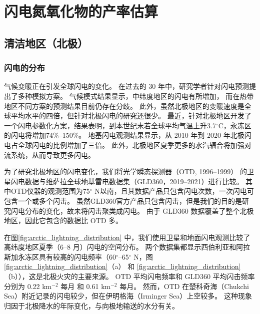 
\chapter{闪电氮氧化物的产率估算} \label{chapter:PE}

\section{清洁地区（北极）}

\subsection{闪电的分布} \label{subsect:lightning_distribution}

气候变暖正在引发全球闪电的变化\citep{Reeve.1999,Williams.2005a,Price.2009a}。
在过去的 30 年中，研究学者针对闪电预测提出了多种模拟方案\citep{Price.1992,Price.1997b,Allen.2002,Futyan.2007,Finney.2014,Romps.2014}。
气候模式结果显示，中纬度地区的闪电有所增加\citep{Michalon.1999,Romps.2014,Luhar.2021}，
而在热带地区不同方案的预测结果目前仍存在分歧\citep{Finney.2018,Romps.2019}。
此外，虽然北极地区的变暖速度是全球平均水平的四倍\citep{Rantanen.2022}，但针对北极闪电的研究还很少。
最近，\citet{Chen.2021a}针对北极地区开发了一个闪电参数化方案，结果表明，到本世纪末若全球平均气温上升3.7$^{\circ}$C，永冻区的闪电将增加74\%--150\%。
地基闪电观测结果显示，从 2010 年到 2020 年北极闪电占全球闪电的比例增加了三倍\citep{Holzworth.2021}。
此外，北极地区夏季更多的水汽辐合将加强对流系统，从而导致更多闪电\citep{Bintanja.2020}。

为了研究北极地区的闪电变化，我们将光学瞬态探测器（OTD, 1996--1999）\citep{Christian.2003} 的卫星闪电数据与维萨拉全球地基雷电数据集（GLD360，2019--2021）进行比较。
其中OTD仪器的观测范围为75$^{\circ}$ N以南，且其数据产品只包含闪电次数，一次闪电可包含一个或多个闪击。
虽然GLD360官方产品只包含闪击，但是我们的目的是研究闪电分布的变化，故未将闪击聚类成闪电。
由于 GLD360 数据覆盖了整个北极地区，因此它包含的数据比 OTD 多。

在图\ref{fig:arctic_lightning_distribution} 中，我们使用卫星和地面闪电观测比较了高纬度地区夏季（6--8 月）闪电的空间分布。
两个数据集都显示西伯利亚和阿拉斯加永冻区具有较高的闪电频率（60$^{\circ}$--65$^{\circ}$ N，图\ref{fig:arctic_lightning_distribution}（a） 和 \ref{fig:arctic_lightning_distribution} （b）），这是北极火灾的主要来源\citep{McCarty.2021}。
OTD 平均闪电频率和 GLD360 平均闪击频率分别为 0.22 km$^{-2}$ 每月 和 0.61 km$^{-2}$ 每月。
然而，OTD 在楚科奇海（Chukchi Sea）附近记录的闪电较少，但在伊明格海（Irminger Sea）上空较多。
这种现象归因于北极降水的年际变化，与向极地输送的水分有关\citep{Bintanja.2020}。

